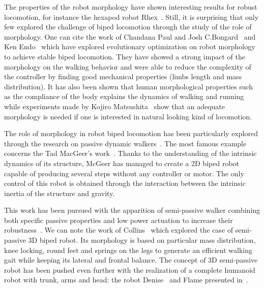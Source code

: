 The properties of the robot morphology have shown interesting results for robust locomotion, for instance the hexapod robot Rhex~\cite{saranli2001rhex}.
Still, it is surprising that only few explored the challenge of biped locomotion through the study of the role of morphology.
One can cite the work of Chandana Paul and Josh C.Bongard~\cite{paul2001road} and Ken Endo~\cite{endo2002co} which have explored evolutionary optimization on robot morphology to achieve stable biped locomotion.
They have showed a strong impact of the morphology on the walking behavior and were able to reduce the complexity of the controller by finding good mechanical properties (limbs length and mass distribution).
It has also been shown that human morphological properties such as the compliance of the body explains the dynamics of walking and running \cite{Geyer2006} while experiments made by Kojiro Matsushita~\cite{matsushita2005locomoting} show that an adequate morphology is needed if one is interested in natural looking kind of locomotion.


The role of morphology in robot biped locomotion has been particularly explored through the research on passive dynamic walkers~\cite{wisse2007passive}.
The most famous example concerns the Tad MacGeer's work~\cite{mcgeer1990passive}.
Thanks to the understanding of the intrinsic dynamics of its structure, McGeer has managed to create a 2D biped robot capable of producing several steps without any controller or motor.
The only control of this robot is obtained through the interaction between the intrinsic inertia of the structure and gravity.

\begin{figure}[]
\centering
    \hfil
    \caption{}
    \label{fig:mcgeer_work}
\end{figure}

This work has been pursued with the apparition of semi-passive walker combining both specific passive properties and low power actuation to increase their robustness~\cite{Anderson2005}.
We can note the work of Collins~\cite{collins2005bipedal} which explored the case of semi-passive 3D biped robot.
Its morphology is based on particular mass distribution, knee locking, round feet and springs on the legs to generate an efficient walking gait while keeping its lateral and frontal balance.
The concept of 3D semi-passive robot has been pushed even further with the realization of a complete humanoid robot with trunk, arms and head: the robot Denise~\cite{wisse2005three} and Flame presented in~\cite{Hobbelen2008}.

